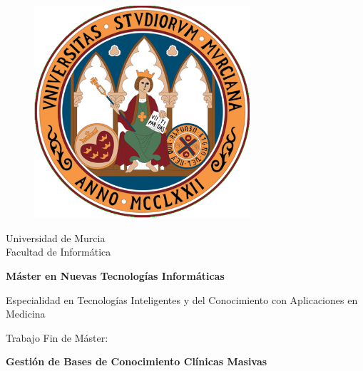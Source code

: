 \documentclass[a4paper,openright,12pt]{book}
\begin{document}
\begin{titlepage}
	\vspace*{\fill}
	\begin{center}
		\vspace*{-1in}
		\begin{figure}[htb]
			\begin{center}
				\includegraphics[width=8cm]{images/logo.png}
			\end{center}
		\end{figure}
		\vspace*{0.15in}
		Universidad de Murcia\\
		\vspace*{0.15in}
		Facultad de Informática \\
		\vspace*{0.6in}
		\begin{large}
			\textbf{Máster en Nuevas Tecnologías Informáticas}\\
		\end{large}
		\vspace*{0.1in}
		\begin{large}
			Especialidad en Tecnologías Inteligentes y del Conocimiento con Aplicaciones en Medicina\\
		\end{large}
		\vspace*{0.1in}
		\begin{large}
			Trabajo Fin de Máster:\\
		\end{large}
		\vspace*{0.2in}
		\begin{Large}
			\textbf{Gestión de Bases de Conocimiento Clínicas Masivas} \\
		\end{Large}

\end{center}
\end{titlepage}
\end{document}
